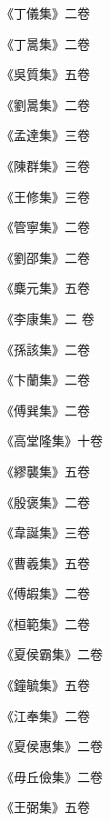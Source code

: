 \begin{pinyinscope}
 《丁儀集》二卷



 《丁暠集》二卷



 《吳質集》五卷



 《劉暠集》二卷



 《孟達集》三卷



 《陳群集》三卷



 《王修集》三卷



 《管寧集》二卷



 《劉邵集》二卷



 《麋元集》五卷



 《李康集》二
 卷



 《孫該集》二卷



 《卞蘭集》二卷



 《傅巽集》二卷



 《高堂隆集》十卷



 《繆襲集》五卷



 《殷褒集》二卷



 《韋誕集》三卷



 《曹羲集》五卷



 《傅嘏集》二卷



 《桓範集》二卷



 《夏侯霸集》二卷



 《鐘毓集》五卷



 《江奉集》二卷



 《夏侯惠集》二卷



 《毋丘儉集》二卷



 《王弼集》五卷




\end{pinyinscope}
